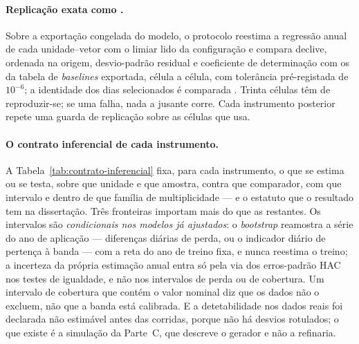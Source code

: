 \paragraph{Replicação exata como .} Sobre a exportação
congelada do modelo, o protocolo reestima a regressão anual de cada
unidade--vetor com o limiar lido da configuração e compara declive,
ordenada na origem, desvio-padrão residual e coeficiente de determinação
com os da tabela de \emph{baselines} exportada, célula a célula, com
tolerância pré-registada de
$10^{-6}$; a identidade dos dias selecionados
é comparada . Trinta células têm de
reproduzir-se; se uma falha, nada a jusante corre. Cada instrumento
posterior repete uma guarda de replicação sobre as células que usa.

\paragraph{O contrato inferencial de cada instrumento.} A
Tabela~\ref{tab:contrato-inferencial} fixa, para cada instrumento, o que
se estima ou se testa, sobre que unidade e que amostra, contra que
comparador, com que intervalo e dentro de que família de multiplicidade
--- e o estatuto que o resultado tem na dissertação. Três fronteiras
importam mais do que as restantes. Os intervalos são \emph{condicionais
nos modelos já ajustados}: o \emph{bootstrap} reamostra a série do ano de
aplicação --- diferenças diárias de perda, ou o indicador diário de
pertença à banda --- com a reta do ano de treino fixa, e nunca reestima o
treino; a incerteza da própria estimação anual entra só pela via dos
erros-padrão HAC nos testes de igualdade, e não nos intervalos de perda ou
de cobertura. Um intervalo de cobertura que contém o valor nominal diz que
os dados não o excluem, não que a banda está calibrada. E a detetabilidade
nos dados reais foi declarada não estimável antes das corridas, porque não
há desvios rotulados; o que existe é a simulação da Parte~C, que descreve o
gerador e não a refinaria.

